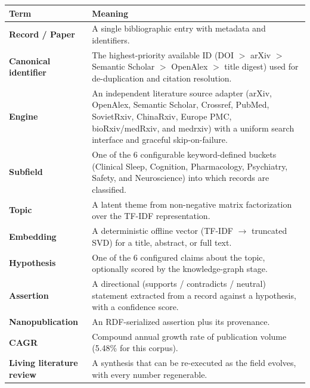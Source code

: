 \documentclass[
  english,
]{article}
\newcounter{none} %
\begin{document}
{\def\LTcaptype{none} %
\begin{longtable}[]{@{}
  >{\raggedright\arraybackslash}p{}
  >{\raggedright\arraybackslash}p{}@{}}
\toprule\noalign{}
\begin{minipage}[b]{\linewidth}\raggedright
Term
\end{minipage} & \begin{minipage}[b]{\linewidth}\raggedright
Meaning
\end{minipage} \\
\midrule\noalign{}
\endhead
\bottomrule\noalign{}
\endlastfoot
\textbf{Record / Paper} & A single bibliographic entry with metadata and
identifiers. \\
\textbf{Canonical identifier} & The highest-priority available ID (DOI
\(>\) arXiv \(>\) Semantic Scholar \(>\) OpenAlex \(>\) title digest)
used for de-duplication and citation resolution. \\
\textbf{Engine} & An independent literature source adapter (arXiv,
OpenAlex, Semantic Scholar, Crossref, PubMed, SovietRxiv, ChinaRxiv,
Europe PMC, bioRxiv/medRxiv, and medrxiv) with a uniform search
interface and graceful skip-on-failure. \\
\textbf{Subfield} & One of the 6 configurable keyword-defined buckets
(Clinical Sleep, Cognition, Pharmacology, Psychiatry, Safety, and
Neuroscience) into which records are classified. \\
\textbf{Topic} & A latent theme from non-negative matrix factorization
over the TF-IDF representation. \\
\textbf{Embedding} & A deterministic offline vector (TF-IDF
\(\rightarrow\) truncated SVD) for a title, abstract, or full text. \\
\textbf{Hypothesis} & One of the 6 configured claims about the topic,
optionally scored by the knowledge-graph stage. \\
\textbf{Assertion} & A directional (supports / contradicts / neutral)
statement extracted from a record against a hypothesis, with a
confidence score. \\
\textbf{Nanopublication} & An RDF-serialized assertion plus its
provenance. \\
\textbf{CAGR} & Compound annual growth rate of publication volume
(5.48\% for this corpus). \\
\textbf{Living literature review} & A synthesis that can be re-executed
as the field evolves, with every number regenerable. \\
\end{longtable}
}
\end{document}
